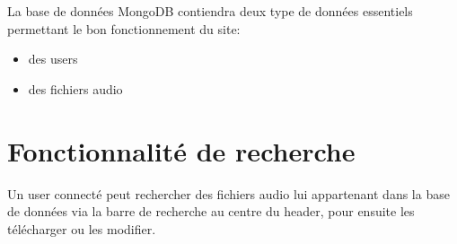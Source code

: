 \documentclass[a4paper,12pt,french]{article}
\begin{document}
La base de données MongoDB contiendra deux type de données essentiels permettant le bon fonctionnement du site:
\begin{itemize}
	\item {} des users
	\item {} des fichiers audio
\end{itemize}

\section{Fonctionnalité de recherche}

Un user connecté peut rechercher des fichiers audio lui appartenant 
dans la base de données via la barre de recherche au centre du header, 
pour ensuite les télécharger ou les modifier.
\end{document}
